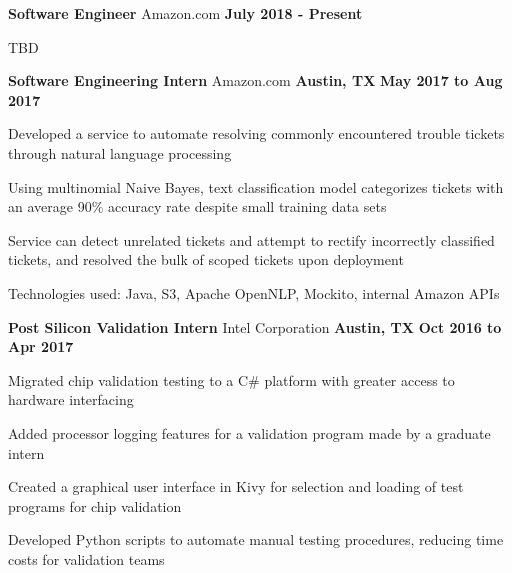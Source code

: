     \begin{cventries}
        \cventry
            {\normalsize \textbf{Software Engineer}}
            {\large Amazon.com}
            {\normalsize \textbf{}}
            {\normalsize \textbf{July 2018 - Present}}
            {
                \begin{cvitems}
                    \item {\normalsize TBD}
                \end{cvitems}
            } 
        \cventry
            {\normalsize \textbf{Software Engineering Intern}}
            {\large Amazon.com}
            {\normalsize \textbf{Austin, TX}}
            {\normalsize \textbf{May 2017 to Aug 2017}}
            {
                \begin{cvitems}
                    \item {\normalsize Developed a service to automate resolving commonly encountered trouble tickets through natural language processing} 
                    \item {\normalsize Using multinomial Naive Bayes, text classification model categorizes tickets with an average 90\% accuracy rate despite small training data sets} 
                    \item {\normalsize Service can detect unrelated tickets and attempt to rectify incorrectly classified tickets, and resolved the bulk of scoped tickets upon deployment}
                    \item {\normalsize Technologies used: Java, S3, Apache OpenNLP, Mockito, internal Amazon APIs}
                \end{cvitems}
            }
        \cventry
            {\normalsize \textbf{Post Silicon Validation Intern}}
            {\large Intel Corporation}
            {\normalsize \textbf{Austin, TX}}
            {\normalsize \textbf{Oct 2016 to Apr 2017}}
            {
                \begin{cvitems}
                    \item {\normalsize Migrated chip validation testing to a C\# platform with greater access to hardware interfacing} 
                    \item {\normalsize Added processor logging features for a validation program made by a graduate intern}
                    \item {\normalsize Created a graphical user interface in Kivy for selection and loading of test programs for chip validation}
                    \item {\normalsize Developed Python scripts to automate manual testing procedures, reducing time costs for validation teams}
                \end{cvitems}
                }
    \end{cventries}
